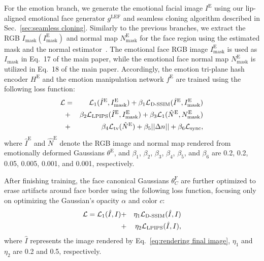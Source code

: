 For the emotion branch, we generate the emotional facial image $I^\text{E}$ using our lip-aligned emotional face generator $g^\text{LEF}$ and seamless cloning algorithm described in Sec.~\ref{sec:seamless cloning}. Similarly to the previous branches, we extract the RGB $I_\text{mask} (I^\text{E}_\text{mask})$ and normal map $N^\text{E}_\text{mask}$ for the face region using the estimated mask and the normal estimator~\cite{Abrevaya_2020_CVPR}. The emotional face RGB image $I^\text{E}_\text{mask}$ is used as $I_\text{mask}$ in Eq.~17 of the main paper, while the emotional face normal map $N^\text{E}_\text{mask}$ is utilized in Eq.~18 of the main paper. Accordingly, the emotion tri-plane hash encoder $H^\text{E}$ and the emotion manipulation network $f^\text{E}$ are trained using the following loss function:
\begin{eqnarray}
    \mathcal{L} &=& \mathcal{L}_1 (\hat{I}^\text{E}, I^\text{E}_\text{mask}) + \beta_1 \mathcal{L}_\text{D-SSIM} (\hat{I}^\text{E}, I^\text{E}_\text{mask}) \nonumber \\
    &+& \beta_2 \mathcal{L}_\text{LPIPS} (\hat{I}^\text{E}, I^\text{E}_\text{mask}) + \beta_3 \mathcal{L}_1 (\hat{N}^\text{E}, N^\text{E}_\text{mask}) \nonumber \\
    &+& \beta_4 \mathcal{L}_\text{tv} (\hat{N}^\text{E}) + \beta_5 || \Delta n || + \beta_6 \mathcal{L}_\text{sync},
\end{eqnarray}
where $\hat{I}^\text{E}$ and $\hat{N}^\text{E}$ denote the RGB image and normal map rendered from emotionally deformed Gaussians $\theta^\text{E}$, and $\beta_1$, $\beta_2$, $\beta_3$, $\beta_4$, $\beta_5$, and $\beta_6$ are 0.2, 0.2, 0.05, 0.005, 0.001, and 0.001, respectively.

After finishing training, the face canonical Gaussians $\theta^\text{F}_C$ are further optimized to erase artifacts around face border using the following loss function, focusing only on optimizing the Gaussian's opacity $\alpha$ and color $c$:
\begin{eqnarray}
    \mathcal{L} = \mathcal{L}_1 (\hat{I}, I) &+& \eta_1 \mathcal{L}_\text{D-SSIM} (\hat{I}, I) \nonumber \\
    &+& \eta_2 \mathcal{L}_\text{LPIPS} (\hat{I}, I),
\end{eqnarray}
where $\hat{I}$ represents the image rendered by Eq.~\ref{eq:rendering final image}, $\eta_1$ and $\eta_2$ are 0.2 and 0.5, respectively.

